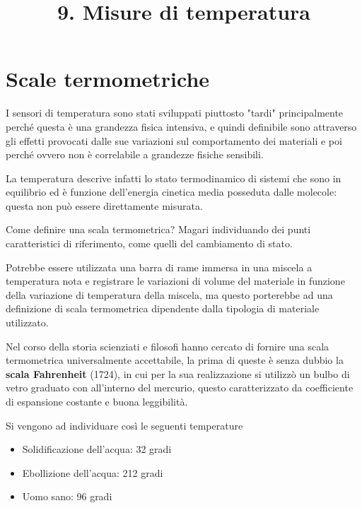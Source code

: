 \documentclass[a4paper, 15pt]{article}
\title{9. Misure di temperatura}
\date{}
\begin{document}
	\maketitle
	\setcounter{tocdepth}{5}    
	\begin{spacing}{0.95}
		\tableofcontents 
	\end{spacing}
	\newpage
	
\section{Scale termometriche}
\begin{adjustwidth}{2in}{}
	I sensori di temperatura sono stati sviluppati piuttosto "tardi" principalmente perché questa è una grandezza fisica intensiva, e quindi definibile sono attraverso gli effetti provocati dalle sue variazioni sul comportamento dei materiali e poi perché ovvero non è correlabile a grandezze fisiche sensibili. \newline 
	
	La temperatura descrive infatti lo stato termodinamico di sistemi che sono in equilibrio ed è funzione dell'energia cinetica media posseduta dalle molecole: questa non può essere direttamente misurata. \newline
	
	Come definire una scala termometrica? Magari individuando dei punti caratteristici di riferimento, come quelli del cambiamento di stato.
	
	Potrebbe essere utilizzata una barra di rame immersa in una miscela a temperatura nota e registrare le variazioni di volume del materiale in funzione della variazione di temperatura della miscela, ma questo porterebbe ad una definizione di scala termometrica dipendente dalla tipologia di materiale utilizzato. \newline 
	
	Nel corso della storia scienziati e filosofi hanno cercato di fornire una scala termometrica universalmente accettabile, la prima di queste è senza dubbio la \textbf{scala Fahrenheit} (1724), in cui per la sua realizzazione si utilizzò un bulbo di vetro graduato con all'interno del mercurio, questo caratterizzato da coefficiente di espansione costante e buona leggibilità. 
	
	Si vengono ad individuare così le seguenti temperature
	\begin{itemize}
		\item Solidificazione dell'acqua: 32 gradi
		\item Ebollizione dell'acqua: 212 gradi
		\item Uomo sano: 96 gradi
	\end{itemize}
	

\end{adjustwidth}
\end{document}
